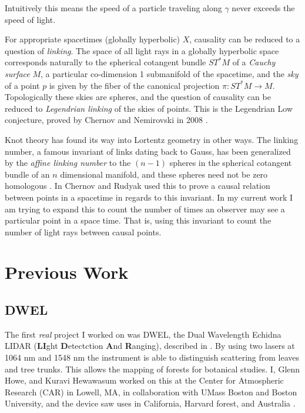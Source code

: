 \documentclass{article}
\theoremstyle{plain}
\begin{document}
        Intuitively this means the speed of a particle traveling along $\gamma$
        never exceeds the speed of light.
        \par\hfill\par
        For appropriate spacetimes (globally hyperbolic) $X$, causality can be
        reduced to a question of \textit{linking}. The space of all light rays
        in a globally hyperbolic space corresponds naturally to the
        spherical cotangent bundle $ST^{*}M$ of a \textit{Cauchy surface} $M$,
        a particular co-dimension 1 submanifold of the spacetime, and the
        \textit{sky} of a point $p$ is given by the fiber of the canonical
        projection $\pi:ST^{*}M\rightarrow{M}$. Topologically these skies are
        spheres, and the question of causality can be reduced to
        \textit{Legendrian linking} of the skies of points. This is the
        Legendrian Low conjecture, proved by Chernov and Nemirovski in 2008
        \cite{ChernovNemirovski2010LowConj}.
        \par\hfill\par
        Knot theory has found its way into Lortentz geometry in other ways.
        The linking number, a famous invariant of links dating back to Gauss,
        has been generalized by the \textit{affine linking number} to the
        $(n-1)$ spheres in the spherical cotangent bundle of an $n$ dimensional
        manifold, and these spheres need not be zero homologous
        \cite{ChernovRudyak2003AffineLinkingGeneralTheory}.
        In \cite{ChernovRudyak2002AffineLinkingAndCausality}
        Chernov and Rudyak used this to prove a causal
        relation between points in a spacetime in regards to this invariant.
        In my current work I am trying to expand this to count the number of
        times an observer may see a particular point in a space time. That is,
        using this invariant to count the number of light rays between
        causal points.
    \section{Previous Work}
        \subsection{DWEL}
            The first \textit{real} project I worked on was DWEL, the
            Dual Wavelength Echidna LIDAR
            (\textbf{LI}ght \textbf{D}etectction \textbf{A}nd \textbf{R}anging),
            described in \cite{DWEL2012}.
            By using two lasers at 1064 nm and 1548 nm the instrument is able
            to distinguish scattering from leaves and tree trunks. This allows
            the mapping of forests for botanical studies. I, Glenn Howe, and
            Kuravi Hewawasum worked on this at the Center for Atmospheric
            Research (CAR) in Lowell, MA, in collaboration with UMass Boston
            and Boston University, and the device saw uses in California,
            Harvard forest, and Australia
            \cite{Li2016RadiometricCO}.
\end{document}
